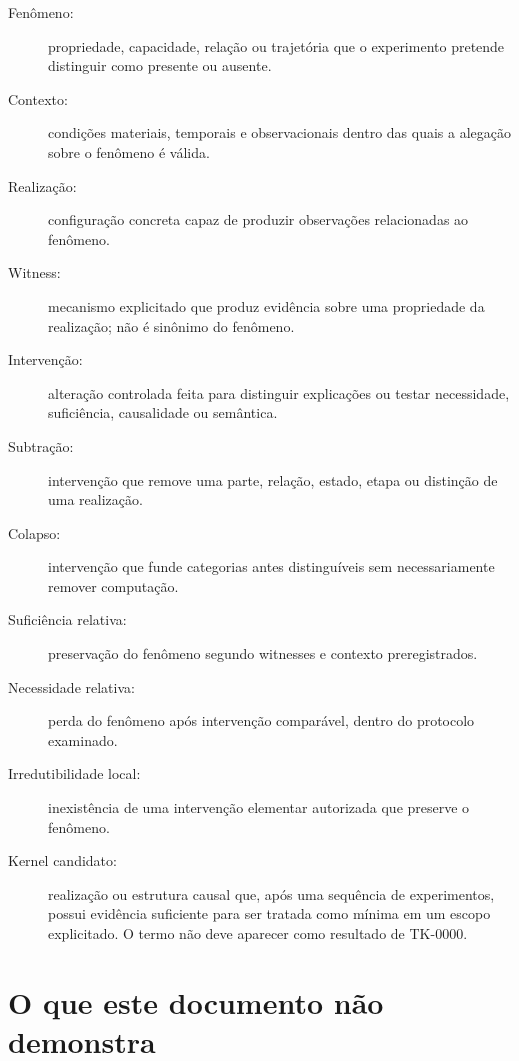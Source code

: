 \documentclass[11pt,a4paper]{article}
\begin{document}
\begin{description}
  \item[Fenômeno:] propriedade, capacidade, relação ou trajetória que o experimento
  pretende distinguir como presente ou ausente.

  \item[Contexto:] condições materiais, temporais e observacionais dentro das quais a
  alegação sobre o fenômeno é válida.

  \item[Realização:] configuração concreta capaz de produzir observações relacionadas
  ao fenômeno.

  \item[Witness:] mecanismo explicitado que produz evidência sobre uma propriedade da
  realização; não é sinônimo do fenômeno.

  \item[Intervenção:] alteração controlada feita para distinguir explicações ou testar
  necessidade, suficiência, causalidade ou semântica.

  \item[Subtração:] intervenção que remove uma parte, relação, estado, etapa ou
  distinção de uma realização.

  \item[Colapso:] intervenção que funde categorias antes distinguíveis sem
  necessariamente remover computação.

  \item[Suficiência relativa:] preservação do fenômeno segundo witnesses e contexto
  preregistrados.

  \item[Necessidade relativa:] perda do fenômeno após intervenção comparável, dentro
  do protocolo examinado.

  \item[Irredutibilidade local:] inexistência de uma intervenção elementar autorizada
  que preserve o fenômeno.

  \item[Kernel candidato:] realização ou estrutura causal que, após uma sequência de
  experimentos, possui evidência suficiente para ser tratada como mínima em um escopo
  explicitado. O termo não deve aparecer como resultado de TK-0000.
\end{description}

\section{O que este documento não demonstra}
\end{document}
